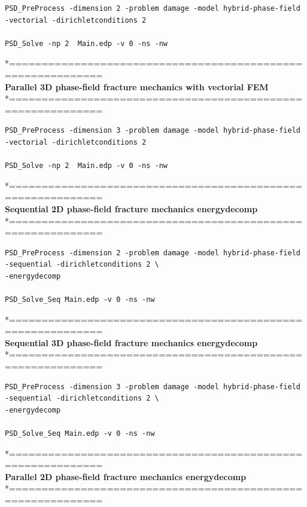 \begin{lstlisting}[style=BashInputStyle]
PSD_PreProcess -dimension 2 -problem damage -model hybrid-phase-field -vectorial -dirichletconditions 2   

PSD_Solve -np 2  Main.edp -v 0 -ns -nw   
\end{lstlisting}
*============================================================\\
\textbf{ Parallel 3D phase-field fracture mechanics  with vectorial FEM} \\
*============================================================\\
\begin{lstlisting}[style=BashInputStyle]
PSD_PreProcess -dimension 3 -problem damage -model hybrid-phase-field -vectorial -dirichletconditions 2   

PSD_Solve -np 2  Main.edp -v 0 -ns -nw   
\end{lstlisting}
*============================================================\\
\textbf{ Sequential 2D  phase-field fracture mechanics energydecomp }\\
*============================================================\\
\begin{lstlisting}[style=BashInputStyle]
PSD_PreProcess -dimension 2 -problem damage -model hybrid-phase-field -sequential -dirichletconditions 2 \
-energydecomp   

PSD_Solve_Seq Main.edp -v 0 -ns -nw   
\end{lstlisting}
*============================================================\\
\textbf{ Sequential 3D phase-field fracture mechanics energydecomp }\\
*============================================================\\
\begin{lstlisting}[style=BashInputStyle]
PSD_PreProcess -dimension 3 -problem damage -model hybrid-phase-field -sequential -dirichletconditions 2 \
-energydecomp   

PSD_Solve_Seq Main.edp -v 0 -ns -nw   
\end{lstlisting}
*============================================================\\
\textbf{ Parallel 2D phase-field fracture mechanics energydecomp }\\
*============================================================\\
